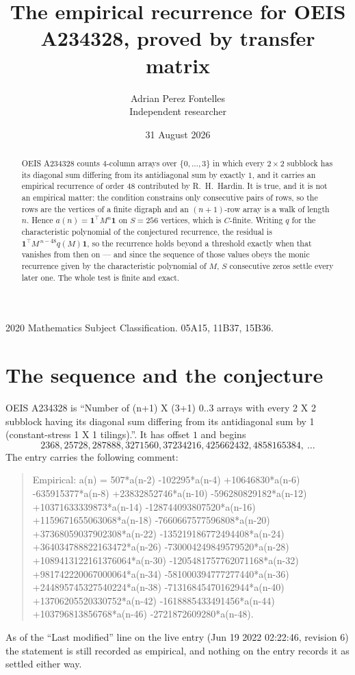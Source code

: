 \documentclass[11pt,a4paper]{article}
\title{The empirical recurrence for OEIS A234328, proved by transfer matrix}
\author{Adrian Perez Fontelles\\ \small Independent researcher}
\date{31 August 2026}
\theoremstyle{plain}
\theoremstyle{definition}
\begin{document}
\maketitle

\begin{abstract}
OEIS A234328 counts $4$-column arrays over $\{0,\dots,3\}$ in which every
$2\times2$ subblock has its diagonal sum differing from its antidiagonal sum by
exactly $1$, and it
carries an empirical recurrence of order $48$ contributed by R.~H.~Hardin. It is true,
and it is not an empirical matter: the condition constrains only consecutive pairs of rows,
so the rows are the vertices of a finite digraph and an $(n+1)$-row array is a walk of
length $n$. Hence $a(n)=\mathbf{1}^{\!\top}M^{n}\mathbf{1}$ on $S=256$ vertices, which
is $C$-finite. Writing $q$ for the characteristic polynomial of the conjectured recurrence,
the residual is $\mathbf{1}^{\!\top}M^{\,n-48}q(M)\mathbf{1}$, so the recurrence
holds beyond a threshold exactly when that vanishes from then on --- and since the sequence
of those values obeys the monic recurrence given by the characteristic polynomial of $M$,
$S$ consecutive zeros settle every later one. The whole test is finite and exact.
\end{abstract}

\noindent\small 2020 Mathematics Subject Classification. 05A15, 11B37, 15B36.\normalsize

\section{The sequence and the conjecture}

OEIS A234328 is ``Number of (n+1) X (3+1) 0..3 arrays with every 2 X 2 subblock having its diagonal sum differing from its antidiagonal sum by 1 (constant-stress 1 X 1 tilings).''. It has offset
$1$ and begins
\[
2368, 25728, 287888, 3271560, 37234216, 425662432, 4858165384,\ \dots
\]
The entry carries the following comment:
\begin{quote}\small
Empirical: a(n) = 507*a(n-2) -102295*a(n-4) +10646830*a(n-6) -635915377*a(n-8) +23832852746*a(n-10) -596280829182*a(n-12) +10371633339873*a(n-14) -128744093807520*a(n-16) +1159671655063068*a(n-18) -7660667577596808*a(n-20) +37368059037902308*a(n-22) -135219186772494408*a(n-24) +364034788822163472*a(n-26) -730004249849579520*a(n-28) +1089413122161376064*a(n-30) -1205481757762071168*a(n-32) +981742220067000064*a(n-34) -581000394777277440*a(n-36) +244895745327540224*a(n-38) -71316845470162944*a(n-40) +13706205520330752*a(n-42) -1618885433491456*a(n-44) +103796813856768*a(n-46) -2721872609280*a(n-48).
\end{quote}
As of the ``Last modified'' line on the live entry (Jun 19 2022 02:22:46, revision 6) the statement is
still recorded as empirical, and nothing on the entry records it as settled either way.
\end{document}
